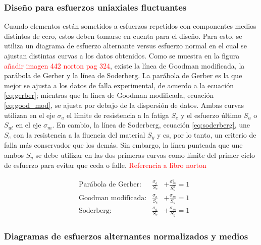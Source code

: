 \subsubsection{Diseño para esfuerzos uniaxiales fluctuantes}
Cuando elementos están sometidos a esfuerzos repetidos con componentes medios distintos de cero, estos deben tomarse en cuenta para el diseño. Para esto, se utiliza un diagrama de esfuerzo alternante versus esfuerzo normal en el cual se ajustan distintas curvas a los datos obtenidos. Como se muestra en la figura \textcolor{red}{añadir imagen 442 norton pag 324}, existe la línea de Goodman modificada, la parábola de Gerber y la línea de Soderberg. La parábola de Gerber es la que mejor se ajusta a los datos de falla experimental, de acuerdo a la ecuación \ref{eq:gerber}; mientras que la línea de Goodman modificada, ecuación \ref{eq:good_mod}, se ajusta por debajo de la dispersión de datos. Ambas curvas utilizan en el eje $\sigma_a$ el límite de resistencia a la fatiga $S_e$ y el esfuerzo último $S_u$ o $S_{ut}$ en el eje $\sigma_m$. En cambio, la línea de Soderberg, ecuación \ref{eq:soderberg}, une $S_e$ con la resistencia a la fluencia del material $S_y$ y es, por lo tanto, un criterio de falla más conservador que los demás. Sin embargo, la línea punteada que une ambos $S_y$ se debe utilizar en las dos primeras curvas como límite del primer ciclo de esfuerzo para evitar que ceda o falle. \textcolor{red}{Referencia a libro norton}

\begin{centering}
\begin{align}
&\text{Parábola de Gerber:}&	\frac{\sigma_a}{S_e} &+ \frac{\sigma_m^2}{S_u^2} = 1 \label{eq:gerber}\\
&\text{Goodman modificada:}&	\frac{\sigma_a}{S_e} &+ \frac{\sigma_m}{S_u} = 1 \label{eq:good_mod}\\
&\text{Soderberg:}&	\frac{\sigma_a}{S_e} &+ \frac{\sigma_m}{S_y} = 1 \label{eq:soderberg}
\end{align}
\end{centering}



\subsubsection{Diagramas de esfuerzos alternantes normalizados y medios}

